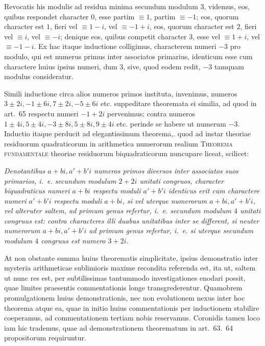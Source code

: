Revocatis his modulis ad residua minima secundum modulum $3$, videmus, eos, quibus respondet character $0$, esse partim $\equiv1$, partim $\equiv-1$; eos, quorum character est $1$, fieri vel $\equiv1-i$, vel $\equiv-1+i$, eos, quorum character est $2$, fieri vel $\equiv i$, vel $\equiv-i$; denique eos, quibus competit character $3$, esse vel $\equiv1+i$, vel $\equiv-1-i$. Ex hac itaque inductione colligimus, characterem numeri $-3$ pro modulo, qui est numerus primus inter associatos primarius, identicum esse cum charactere huius ipsius numeri, dum $3$, sive, quod eodem redit, $-3$ tamquam modulus consideratur.

Simili inductione circa alios numeros primos instituta, invenimus, numeros $3\pm2i,-1\pm6i,7\pm2i,-5\pm6i$ etc. suppeditare theoremata ei similia, ad quod in art.~65 respectu numeri $-1+2i$ pervenimus; contra numeros $1\pm4i,5\pm4i,-3\pm8i,5\pm8i,9\pm4i$ etc. perinde se habere ut numerum $-3$. Inductio itaque perducit ad elegantissimum theorema,. quod ad instar theoriae residuorum quadraticorum in arithmetica numerorum realium \textsc{Theorema fundamentale} theoriae residuorum biquadraticorum nuncupare liceat, scilicet:

\emph{Denotantibus $a+bi,a'+b'i$ numeros primos diversos inter associatos suos primarios, i.~e. secundum modulum $2+2i$ unitati congruos, character biquadraticus numeri $a+bi$ respectu moduli $a'+b'i$ identicus erit cum charactere numeri $a'+b'i$ respectu moduli $a+bi$, si vel uterque numerorum $a+bi,a'+b'i$, vel alteruter saltem, ad primum genus refertur, i.~e. secundum modulum $4$ unitati congruus est: contra characteres illi duabus unitatibus inter se different, si neuter numerorum $a+bi,a'+b'i$ ad primum genus refertur, i.~e. si uterque secundum modulum $4$ congruus est numero $3+2i$.}

%
At non obstante summa huius theorematis simplicitate, ipsius demonstratio inter mysteria arithmeticae sublimioris maxime recondita referenda est, ita ut, saltem ut nunc res est, per subtilissimas tantummodo investigationes enodari possit, quae limites praesentis commentationis longe transgrederentur. Quamobrem promulgationem huius demonstrationis, nec non evolutionem nexus inter hoc theorema atque ea, quae in initio huius commentationis per inductionem stabilire coeperamus, ad commentationem tertiam nobis reservamus. Coronidis tamen loco iam hic trademus, quae ad demonstrationem theorematum in art.~63.~64 propositorum requiruntur.

